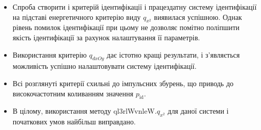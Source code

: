 \begin{itemize}

  \item
    Спроба створити і критерій ідентифікації і працездатну систему
    ідентифікації на підставі енергетичного критерію виду
    $q_{x^2}$ виявилася успішною. Однак рівень помилок ідентифікації
    при цьому не дозволяє помітно поліпшити якість ідентифікації
    за рахунок налаштування її параметрів.

  \item
    Використання критерію
    $q_{dxOy}$ дає істотно кращі результати, і з'являється можливість
    успішно налаштовувати систему ідентифікації.

  \item
    Всі розглянуті критерії схильні до імпульсних збурень, що
    приводь до високочастотним коливанням значення
    $p_{\mathrm{id}}$.

  \item
    В цілому, використання методу ql3rlWvnleW.$q_{x^2}$
    для даної системи і початкових умов найбільш виправдано.

\end{itemize}





